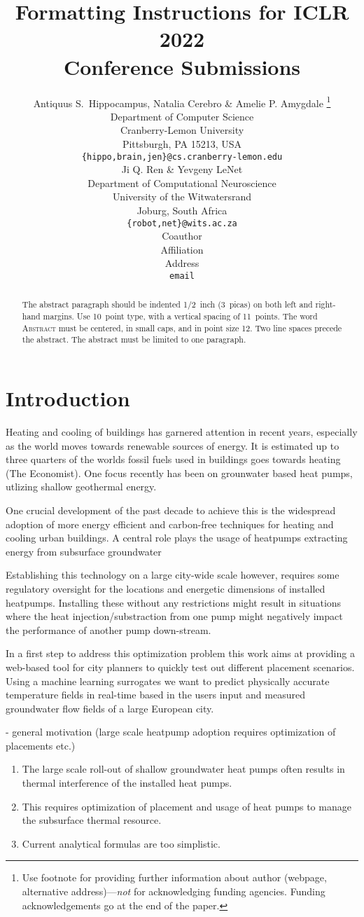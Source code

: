 \documentclass{article} %
\title{Formatting Instructions for ICLR 2022 \\ Conference Submissions}
\author{Antiquus S.~Hippocampus, Natalia Cerebro \& Amelie P. Amygdale \thanks{ Use footnote for providing further information
about author (webpage, alternative address)---\emph{not} for acknowledging
funding agencies.  Funding acknowledgements go at the end of the paper.} \\
Department of Computer Science\\
Cranberry-Lemon University\\
Pittsburgh, PA 15213, USA \\
\texttt{\{hippo,brain,jen\}@cs.cranberry-lemon.edu} \\
\And
Ji Q. Ren \& Yevgeny LeNet \\
Department of Computational Neuroscience \\
University of the Witwatersrand \\
Joburg, South Africa \\
\texttt{\{robot,net\}@wits.ac.za} \\
\AND
Coauthor \\
Affiliation \\
Address \\
\texttt{email}
}
\begin{document}
\maketitle

\begin{abstract}
   The abstract paragraph should be indented 1/2~inch (3~picas) on both left and
   right-hand margins. Use 10~point type, with a vertical spacing of 11~points.
   The word \textsc{Abstract} must be centered, in small caps, and in point size 12. Two
   line spaces precede the abstract. The abstract must be limited to one
   paragraph.
\end{abstract}

\section{Introduction}
\label{sec:intro}
Heating and cooling of buildings has garnered attention in recent years, especially as the world moves towards renewable sources of energy. 
It is estimated up to three quarters of the worlds fossil fuels used in buildings goes towards heating (The Economist).
One focus recently has been on grounwater based heat pumps, utlizing shallow geothermal energy.


One crucial development of the past decade to achieve this is the widespread adoption of more energy efficient and carbon-free techniques for heating and cooling urban buildings.
A central role plays the usage of heatpumps extracting energy from subsurface groundwater 

Establishing this technology on a large city-wide scale however, requires some regulatory oversight for the locations and energetic dimensions of installed heatpumps.
Installing these without any restrictions might result in situations where the heat injection/substraction from one pump might negatively impact the performance of another pump down-stream.

In a first step to address this optimization problem this work aims at providing a web-based tool for city planners to quickly test out different placement scenarios.
Using a machine learning surrogates we want to predict physically accurate temperature fields in real-time based in the users input and measured groundwater flow fields of a large European city.

- general motivation (large scale heatpump adoption requires optimization of placements etc.)
\begin{enumerate}
\item The large scale roll-out of shallow groundwater heat pumps often results in thermal interference of the installed heat pumps.
\item This requires optimization of placement and usage of heat pumps to manage the subsurface thermal resource.
\item Current analytical formulas are too simplistic.
\end{enumerate}
\end{document}
